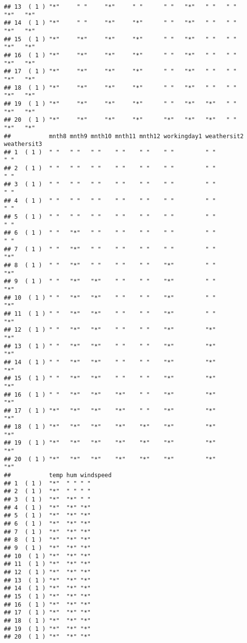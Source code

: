 \documentclass[]{article}
\begin{document}
\begin{verbatim}
## 13  ( 1 ) "*"     " "     "*"     " "      " "   "*"   " "   " "   "*"   "*"  
## 14  ( 1 ) "*"     " "     "*"     "*"      " "   "*"   " "   " "   "*"   "*"  
## 15  ( 1 ) "*"     "*"     "*"     "*"      " "   "*"   " "   " "   "*"   "*"  
## 16  ( 1 ) "*"     "*"     "*"     "*"      " "   "*"   " "   " "   "*"   "*"  
## 17  ( 1 ) "*"     "*"     "*"     "*"      " "   "*"   " "   " "   "*"   "*"  
## 18  ( 1 ) "*"     "*"     "*"     "*"      " "   "*"   " "   " "   "*"   "*"  
## 19  ( 1 ) "*"     "*"     "*"     "*"      " "   "*"   "*"   " "   "*"   "*"  
## 20  ( 1 ) "*"     "*"     "*"     "*"      "*"   "*"   "*"   " "   "*"   "*"  
##           mnth8 mnth9 mnth10 mnth11 mnth12 workingday1 weathersit2 weathersit3
## 1  ( 1 )  " "   " "   " "    " "    " "    " "         " "         " "        
## 2  ( 1 )  " "   " "   " "    " "    " "    " "         " "         " "        
## 3  ( 1 )  " "   " "   " "    " "    " "    " "         " "         " "        
## 4  ( 1 )  " "   " "   " "    " "    " "    " "         " "         " "        
## 5  ( 1 )  " "   " "   " "    " "    " "    " "         " "         " "        
## 6  ( 1 )  " "   "*"   " "    " "    " "    " "         " "         " "        
## 7  ( 1 )  " "   "*"   " "    " "    " "    " "         " "         "*"        
## 8  ( 1 )  " "   "*"   " "    " "    " "    "*"         " "         "*"        
## 9  ( 1 )  " "   "*"   "*"    " "    " "    "*"         " "         "*"        
## 10  ( 1 ) " "   "*"   "*"    " "    " "    "*"         " "         "*"        
## 11  ( 1 ) " "   "*"   "*"    " "    " "    "*"         " "         "*"        
## 12  ( 1 ) " "   "*"   "*"    " "    " "    "*"         "*"         "*"        
## 13  ( 1 ) " "   "*"   "*"    " "    " "    "*"         "*"         "*"        
## 14  ( 1 ) " "   "*"   "*"    " "    " "    "*"         "*"         "*"        
## 15  ( 1 ) " "   "*"   "*"    " "    " "    "*"         "*"         "*"        
## 16  ( 1 ) " "   "*"   "*"    "*"    " "    "*"         "*"         "*"        
## 17  ( 1 ) "*"   "*"   "*"    "*"    " "    "*"         "*"         "*"        
## 18  ( 1 ) "*"   "*"   "*"    "*"    "*"    "*"         "*"         "*"        
## 19  ( 1 ) "*"   "*"   "*"    "*"    "*"    "*"         "*"         "*"        
## 20  ( 1 ) "*"   "*"   "*"    "*"    "*"    "*"         "*"         "*"        
##           temp hum windspeed
## 1  ( 1 )  "*"  " " " "      
## 2  ( 1 )  "*"  " " " "      
## 3  ( 1 )  "*"  "*" " "      
## 4  ( 1 )  "*"  "*" "*"      
## 5  ( 1 )  "*"  "*" "*"      
## 6  ( 1 )  "*"  "*" "*"      
## 7  ( 1 )  "*"  "*" "*"      
## 8  ( 1 )  "*"  "*" "*"      
## 9  ( 1 )  "*"  "*" "*"      
## 10  ( 1 ) "*"  "*" "*"      
## 11  ( 1 ) "*"  "*" "*"      
## 12  ( 1 ) "*"  "*" "*"      
## 13  ( 1 ) "*"  "*" "*"      
## 14  ( 1 ) "*"  "*" "*"      
## 15  ( 1 ) "*"  "*" "*"      
## 16  ( 1 ) "*"  "*" "*"      
## 17  ( 1 ) "*"  "*" "*"      
## 18  ( 1 ) "*"  "*" "*"      
## 19  ( 1 ) "*"  "*" "*"      
## 20  ( 1 ) "*"  "*" "*"
\end{verbatim}
\end{document}
